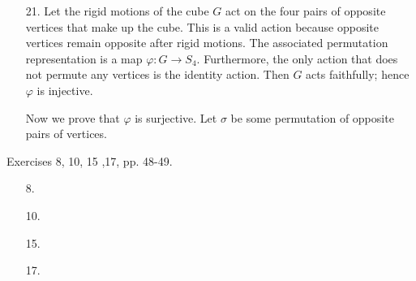 \documentclass[12pt]{article}
\theoremstyle{remark}
\theoremstyle{named}
\begin{document}
\begin{enumerate}
    \item [21.] Let the rigid motions of the cube \(G\) act on the four pairs of opposite vertices that make up the cube. This is a valid action because opposite vertices remain opposite after rigid motions. The associated permutation representation is a map \(\varphi : G \to S_4\). Furthermore, the only action that does not permute any vertices is the identity action. Then \(G\) acts faithfully; hence \(\varphi\) is injective. 
    
    Now we prove that \(\varphi\) is surjective. Let \(\sigma\) be some permutation of opposite pairs of vertices. 
\end{enumerate}

Exercises 8, 10, 15 ,17, pp. 48-49.

\begin{enumerate}
    \item [8.] 
    \item [10.] 
    \item [15.] 
    \item [17.] 
\end{enumerate}

% 
        
        
\end{document}
